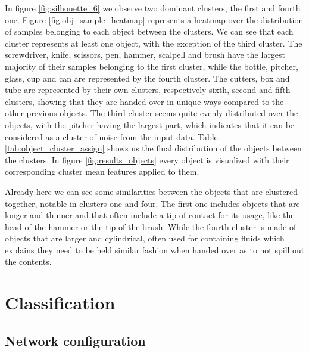 In figure \ref{fig:silhouette_6} we observe two dominant clusters, the first and fourth one. Figure \ref{fig:obj_sample_heatmap} represents a heatmap over the distribution of samples belonging to each object between the clusters. We can see that each cluster represents at least one object, with the exception of the third cluster. The screwdriver, knife, scissors, pen, hammer, scalpell and brush have the largest majority of their samples belonging to the first cluster, while the bottle, pitcher, glass, cup and can are represented by the fourth cluster. The cutters, box and tube are represented by their own clusters, respectively sixth, second and fifth clusters, showing that they are handed over in unique ways compared to the other previous objects. The third cluster seems quite evenly distributed over the objects, with the pitcher having the largest part, which indicates that it can be considered as a cluster of noise from the input data. Table \ref{tab:object_cluster_assign} shows us the final distribution of the objects between the clusters. In figure \ref{fig:results_objects} every object is visualized with their corresponding cluster mean features applied to them.

Already here we can see some similarities between the objects that are clustered together, notable in clusters one and four. The first one includes objects that are longer and thinner and that often include a tip of contact for its usage, like the head of the hammer or the tip of the brush. While the fourth cluster is made of objects that are larger and cylindrical, often used for containing fluids which explains they need to be held similar fashion when handed over as to not spill out the contents.



%

\section{Classification}

\subsection{Network configuration}
\label{sec:res_setup}

